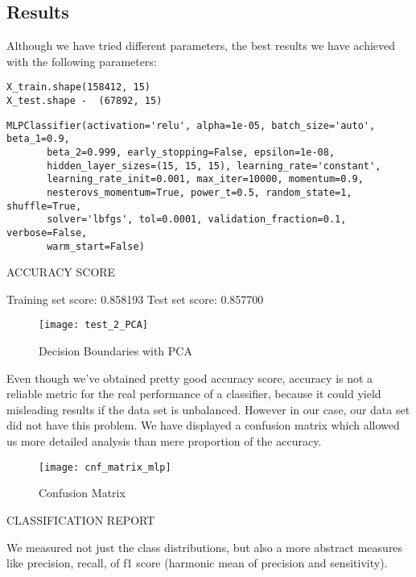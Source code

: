 \documentclass[journal]{IEEEtran}
\begin{document}
\subsection{Results}

Although we have tried different parameters, the best results we have achieved with the following parameters:

\begin{lstlisting}
X_train.shape(158412, 15)
X_test.shape -  (67892, 15)
\end{lstlisting}

\begin{lstlisting}
MLPClassifier(activation='relu', alpha=1e-05, batch_size='auto', beta_1=0.9,
       beta_2=0.999, early_stopping=False, epsilon=1e-08,
       hidden_layer_sizes=(15, 15, 15), learning_rate='constant',
       learning_rate_init=0.001, max_iter=10000, momentum=0.9,
       nesterovs_momentum=True, power_t=0.5, random_state=1, shuffle=True,
       solver='lbfgs', tol=0.0001, validation_fraction=0.1, verbose=False,
       warm_start=False)
\end{lstlisting}


ACCURACY SCORE

Training set score: 0.858193
Test set score: 0.857700

\begin{figure}[ht]
\centering
\texttt{[image: test\_2\_PCA]}
\caption{Decision Boundaries with PCA}
\label{fig:decision_boundaries}
\end{figure}

Even though we’ve obtained pretty good accuracy score, accuracy is not a reliable metric for the real performance of a classifier, because it could yield misleading results if the data set is unbalanced. However in our case, our data set did not have this problem. We have displayed a confusion matrix which allowed us more detailed analysis than mere proportion of the accuracy.

\begin{figure}[ht]
\centering
\texttt{[image: cnf\_matrix\_mlp]}
\caption{Confusion Matrix}
\label{fig:cnf_matrix_mlp}
\end{figure}

CLASSIFICATION REPORT

We measured not just the class distributions, but also a more abstract measures like precision, recall, of f1 score (harmonic mean of precision and sensitivity).
\end{document}
